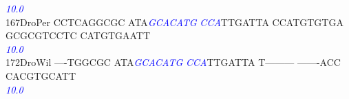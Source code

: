 \documentclass[11pt,twoside,reqno,a4paper]{article}
\begin{document}
{\hspace*{4\charwidth}\hspace*{7\charwidth}\hspace*{1\charwidth}\hspace*{13\charwidth}\textit{\textcolor{blue}{10.0}}\hspace*{1\charwidth}\hspace*{1\charwidth}\hspace*{1\charwidth}\hspace*{1\charwidth}\hspace*{1\charwidth}\\
167\hspace*{1\charwidth}DroPer	CCTCAGGCGC	ATA\textit{\textcolor{blue}{G}}\textit{\textcolor{blue}{C}}\textit{\textcolor{blue}{A}}\textit{\textcolor{blue}{C}}\textit{\textcolor{blue}{A}}\textit{\textcolor{blue}{T}}\textit{\textcolor{blue}{G}}	\textit{\textcolor{blue}{C}}\textit{\textcolor{blue}{C}}\textit{\textcolor{blue}{A}}TTGATTA	CCATGTGTGA	GCGCGTCCTC	CATGTGAATT	\\
\hspace*{4\charwidth}\hspace*{7\charwidth}\hspace*{1\charwidth}\hspace*{13\charwidth}\textit{\textcolor{blue}{10.0}}\hspace*{1\charwidth}\hspace*{1\charwidth}\hspace*{1\charwidth}\hspace*{1\charwidth}\hspace*{1\charwidth}\\
172\hspace*{1\charwidth}DroWil	----TGGCGC	ATA\textit{\textcolor{blue}{G}}\textit{\textcolor{blue}{C}}\textit{\textcolor{blue}{A}}\textit{\textcolor{blue}{C}}\textit{\textcolor{blue}{A}}\textit{\textcolor{blue}{T}}\textit{\textcolor{blue}{G}}	\textit{\textcolor{blue}{C}}\textit{\textcolor{blue}{C}}\textit{\textcolor{blue}{A}}TTGATTA	T---------	-------ACC	CACGTGCATT	\\
\hspace*{4\charwidth}\hspace*{7\charwidth}\hspace*{1\charwidth}\hspace*{13\charwidth}\textit{\textcolor{blue}{10.0}}\hspace*{1\charwidth}\hspace*{1\charwidth}\hspace*{1\charwidth}\hspace*{1\charwidth}\hspace*{1\charwidth}\\
}
\end{document}

